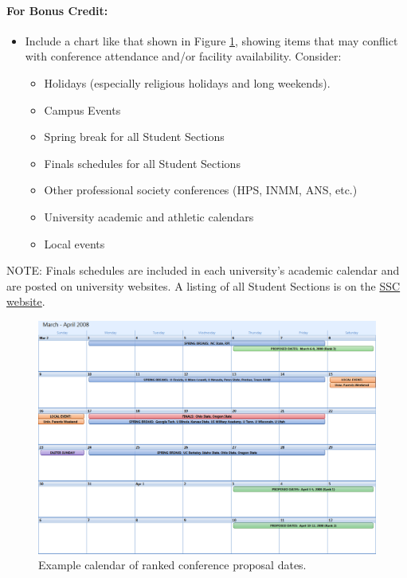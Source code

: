 \documentclass[12pt]{article}
\begin{document}
\paragraph{For Bonus Credit:}
\begin{itemize}
\item{Include a chart like that shown in Figure \ref{fig:conference_dates}, showing items that may conflict with
conference attendance and/or facility availability. Consider:
\begin{itemize}
\item{Holidays (especially religious holidays and long weekends).}
\item{Campus Events}
\item{Spring break for all Student Sections}
\item{Finals schedules for all Student Sections}
\item{Other professional society conferences (HPS, INMM, ANS, etc.)}
\item{University academic and athletic calendars}
\item{Local events}
\end{itemize}
}
\end{itemize}

NOTE: Finals schedules are included in each university's academic calendar and are posted on university websites. A listing of all Student Sections is on the \href{http://students.ans.org}{SSC website}.

\begin{figure}[h]
\centering
\includegraphics[width=16cm]{conference_dates.png}
\caption{Example calendar of ranked conference proposal dates.}
\label{fig:conference_dates}
\end{figure}
\end{document}
